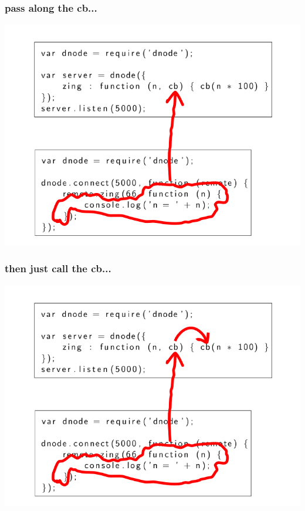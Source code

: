 \documentclass{beamer}
\begin{document}
\begin{frame}
\frametitle{pass along the cb...}
\includegraphics[scale=0.6]{images/zing_flow_2.png}
\end{frame}

\begin{frame}
\frametitle{then just call the cb...}
\includegraphics[scale=0.6]{images/zing_flow_3.png}
\end{frame}
\end{document}
